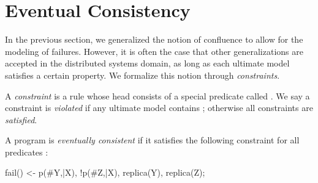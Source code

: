 \section{Eventual Consistency}

In the previous section, we generalized the notion of confluence to allow for the modeling of failures.  However, it is often the case that other generalizations are accepted in the distributed systems domain, as long as each ultimate model satisfies a certain property.  We formalize this notion through {\em constraints}.

\begin{definition}
A {\em constraint} is a rule whose head consists of a special predicate called .  We say a constraint is {\em violated} if any ultimate model contains ; otherwise all constraints are {\em satisfied}.
\end{definition}

%
%


\begin{definition}
A \lang program is {\em eventually consistent} if it satisfies the following constraint for all predicates :

\begin{Dedalus}
fail() <- p(#Y,\bar{X}), !p(#Z,\bar{X}), replica(Y), replica(Z);
\end{Dedalus}
\end{definition}

